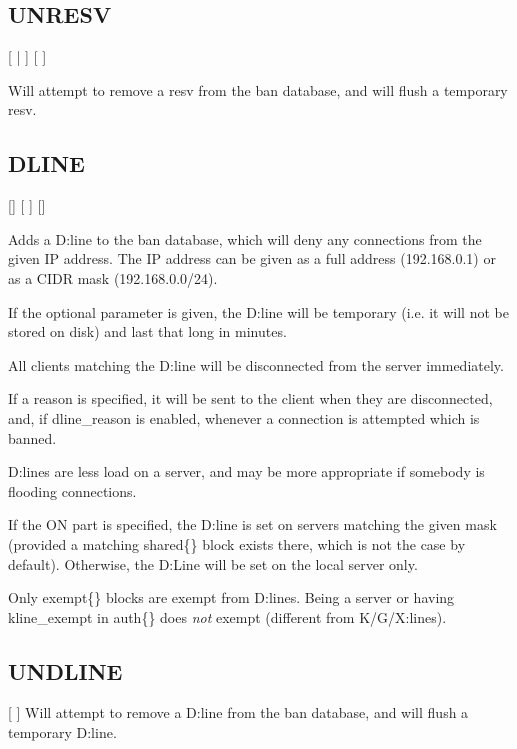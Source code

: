 \subsection{UNRESV}

 [ | ] [ ]

	Will attempt to remove a resv from the ban database, and will
	flush a temporary resv.

\subsection{DLINE}

 []  [ ] [\literal{:}]

	Adds a D:line to the ban database, which will deny any
	connections from the given IP address. The IP address can be given as a
	full address (192.168.0.1) or as a CIDR mask (192.168.0.0\slash24).

	If the optional parameter  is given, the D:line
	will be temporary (i.e. it will not be stored on disk) and last that
	long in minutes.

	All clients matching the D:line will be disconnected from the server
	immediately.

	If a reason is specified, it will be sent to the client when they are
	disconnected, and, if dline\_reason is enabled, whenever a connection
	is attempted which is banned.

	D:lines are less load on a server, and may be more appropriate if
	somebody is flooding connections.

	If the ON part is specified, the D:line is set on servers matching the
	given mask (provided a matching shared\{\} block exists there, which is
	not the case by default). Otherwise, the D:Line will be set on the
	local server only.

	Only exempt\{\} blocks are exempt from D:lines. Being a server or having
	kline\_exempt in auth\{\} does \emph{not} exempt (different from
	K/G/X:lines).

\subsection{UNDLINE}

  [ ]
	Will attempt to remove a D:line from the ban database, and will
	flush a temporary D:line.


